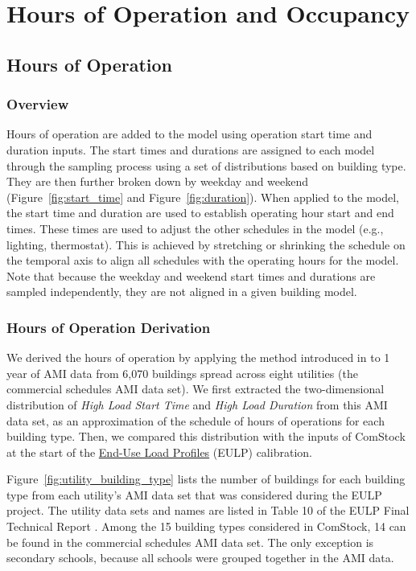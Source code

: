 \section{Hours of Operation and Occupancy}
\label{sec:hoo}

\subsection{Hours of Operation}
\subsubsection{Overview}
Hours of operation are added to the model using operation start time and duration inputs. The start times and durations are assigned to each model through the sampling process using a set of distributions based on building type. They are then further broken down by weekday and weekend (Figure~\ref{fig:start_time} and Figure~\ref{fig:duration}). When applied to the model, the start time and duration are used to establish operating hour start and end times. These times are used to adjust the other schedules in the model (e.g., lighting, thermostat). This is achieved by stretching or shrinking the schedule on the temporal axis to align all schedules with the operating hours for the model. Note that because the weekday and weekend start times and durations are sampled independently, they are not aligned in a given building model.

\subsubsection{Hours of Operation Derivation}
We derived the hours of operation by applying the method introduced in \cite{bianchi2020modeling} to 1 year of AMI data from 6,070 buildings spread across eight utilities (the commercial schedules AMI data set). We first extracted the two-dimensional distribution of \textit{High Load Start Time} and \textit{High Load Duration} from this AMI data set, as an approximation of the schedule of hours of operations for each building type. Then, we compared this distribution with the inputs of ComStock at the start of 
 the \href{https://www.nrel.gov/buildings/end-use-load-profiles.html}{End-Use Load Profiles} (EULP) calibration.

Figure~\ref{fig:utility_building_type} lists the number of buildings for each building type from each utility's AMI data set that was considered during the EULP project. The utility data sets and names are listed in Table 10 of the EULP Final Technical Report \citep{eulp_final_report}. Among the 15 building types considered in ComStock, 14 can be found in the commercial schedules AMI data set. The only exception is secondary schools, because all schools were grouped together in the AMI data.

